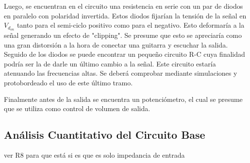 Luego, se encuentran en el circuito una resistencia en serie con un par de diodos en paralelo con polaridad invertida. Estos diodos fijarían la tensión de la señal en $V_{d_{on}}$ tanto para el semi-ciclo positivo como para el negativo. Esto deformaría a la señal generando un efecto de "clipping". Se presume que esto se apreciaría como una gran distorsión a la hora de conectar una guitarra y escuchar la salida.\\

Seguido de los diodos se puede encontrar un pequeño circuito R-C cuya finalidad podría ser la de darle un último cambio a la señal. Este circuito estaría atenuando las frecuencias altas. Se deberá comprobar mediante simulaciones y protobordeado el uso de este último tramo.

Finalmente antes de la salida se encuentra un potenciómetro, el cual se presume que se utiliza como control de volumen de salida.

\subsection{Análisis Cuantitativo del Circuito Base}

\large{ver R8 para que está si es que es solo impedancia de entrada}



 
